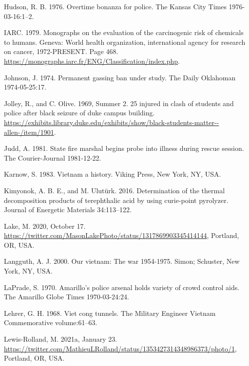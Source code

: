 \documentclass[
  11pt,
]{krantz}
\newlength{\cslhangindent}
\newenvironment{CSLReferences}[2] %
 {%
  \setlength{\parindent}{0pt}
  \ifodd #1 \everypar{\setlength{\hangindent}{\cslhangindent}}\ignorespaces\fi
  \ifnum #2 > 0
  \setlength{\parskip}{#2\baselineskip}
  \fi
 }%
 {}
\begin{document}
\begin{CSLReferences}{1}{0}
\leavevmode{}%
Hudson, R. B. 1976. Overtime bonanza for police. The Kansas City Times 1976-03-16:1--2.

\leavevmode{}%
IARC. 1979. Monographs on the evaluation of the carcinogenic risk of chemicals to humans. Geneva: World health organization, international agency for research on cancer, 1972-PRESENT. Page 468. \url{https://monographs.iarc.fr/ENG/Classification/index.php}.

\leavevmode{}%
Johnson, J. 1974. Permanent gassing ban under study. The Daily Oklahoman 1974-05-25:17.

\leavevmode{}%
Jolley, R., and C. Olive. 1969, Summer 2. 25 injured in clash of students and police after black seizure of duke campus building. \url{https://exhibits.library.duke.edu/exhibits/show/black-students-matter--allen-/item/1901}.

\leavevmode{}%
Judd, A. 1981. State fire marshal begins probe into illness during rescue session. The Courier-Journal 1981-12-22.

\leavevmode{}%
Karnow, S. 1983. Vietnam a history. Viking Press, New York, NY, USA.

\leavevmode{}%
Kimyonok, A. B. E., and M. Ulutürk. 2016. Determination of the thermal decomposition products of terephthalic acid by using curie-point pyrolyzer. Journal of Energetic Materials 34:113--122.

\leavevmode{}%
Lake, M. 2020, October 17. \url{https://twitter.com/MasonLakePhoto/status/1317869903345414144}, Portland, OR, USA.

\leavevmode{}%
Langguth, A. J. 2000. Our vietnam: The war 1954-1975. Simon; Schuster, New York, NY, USA.

\leavevmode{}%
LaPrade, S. 1970. Amarillo's police arsenal holds variety of crowd control aids. The Amarillo Globe Times 1970-03-24:24.

\leavevmode{}%
Lehrer, G. H. 1968. Viet cong tunnels. The Military Engineer Vietnam Commemorative volume:61--63.

\leavevmode{}%
Lewis-Rolland, M. 2021a, January 23. \url{https://twitter.com/MathieuLRolland/status/1353427314348986373/photo/1}, Portland, OR, USA.


\end{CSLReferences}
\end{document}
